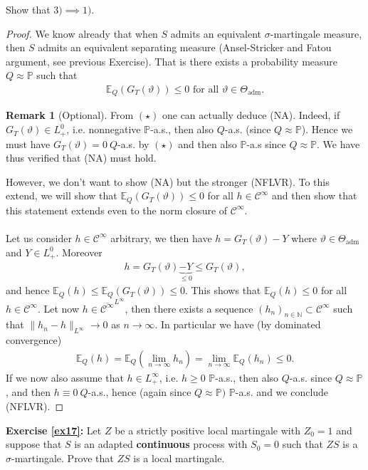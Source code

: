 \documentclass[12pt,a4paper, twoside]{article}
\theoremstyle{definition}
\newtheorem{rem}{Remark}[section]
\newcommand{\EE}{\mathbb{E}} %
\newcommand{\PP}{\mathbb{P}} %
\begin{document}
Show that $3) \implies 1)$. 
\begin{proof}
We know already that when $S$ admits an equivalent $\sigma$-martingale measure, then $S$ admits an equivalent separating measure (Ansel-Stricker and Fatou argument, see previous Exercise). That is there exists a probability measure $Q \approx \PP$ such that \begin{align*}
\EE_Q(G_T( \vartheta)) \leq 0 \text{ for all } \vartheta \in \Theta_\text{adm}. \tag{$\star$}
\end{align*}
\begin{rem}[Optional] From $(\star)$ one can actually deduce (NA). Indeed, if $G_T( \vartheta) \in L_+^0$, i.e. nonnegative $\PP$-a.s., then also $Q$-a.s. (since $Q \approx \PP$). Hence we must have $G_T( \vartheta)=0 \ Q$-a.s. by $(\star)$ and then also $\PP$-a.s since $Q \approx \PP$. We have thus verified that (NA) must hold.
\end{rem}
However, we don't want to show (NA) but the stronger (NFLVR). To this extend, we will show that $\EE_Q(G_T( \vartheta)) \leq 0 $ for all $h \in \mathcal{C}^\infty$ and then show that this statement extends even to the norm closure of $\mathcal{C}^\infty$. \\
\\
Let us consider $h \in \mathcal{C}^\infty$ arbitrary, we then have $h=G_T( \vartheta)-Y$ where $\vartheta \in \Theta_\text{adm}$ and $Y \in L_+^0$. Moreover 
\begin{align*}
h=G_T( \vartheta)\underbrace{-Y}_{ \leq 0} \leq G_T( \vartheta),
\end{align*}
and hence $\EE_Q(h) \leq \EE_Q(G_T( \vartheta)) \leq 0.$ This shows that $\EE_Q(h) \leq 0$ for all $h \in \mathcal{C}^\infty$. Let now $h \in \overline{\mathcal{C}^\infty}^{L^\infty}$, then there exists a sequence $(h_n)_{n \in \mathbb{N}} \subset \mathcal{C}^\infty$ such that $\|h_n-h\|_{L^\infty} \to 0$ as $n \to \infty$. In particular we have (by dominated convergence)
\begin{align*}
\EE_Q(h) = \EE_Q( \lim_{n \to \infty} h_n) = \lim_{n \to \infty} \EE_Q(h_n) \leq 0.
\end{align*} 
If we now also assume that $h \in L_+^\infty$, i.e. $h \geq 0$ $\PP$-a.s., then also $Q$-a.s. since $Q \approx \PP$, and then $h\equiv 0 \ Q$-a.s., hence (again since $Q \approx \PP)$ $\PP$-a.s. and we conclude (NFLVR). 
\end{proof}
\newpage
\noindent \textbf{Exercise \ref{ex17}:} Let $Z$ be a strictly positive local martingale with $Z_0=1$ and suppose that $S$ is an adapted \textbf{continuous} process with $S_0=0$ such that $ZS$ is a $\sigma$-martingale. Prove that $ZS$ is a local martingale. 
\end{document}
